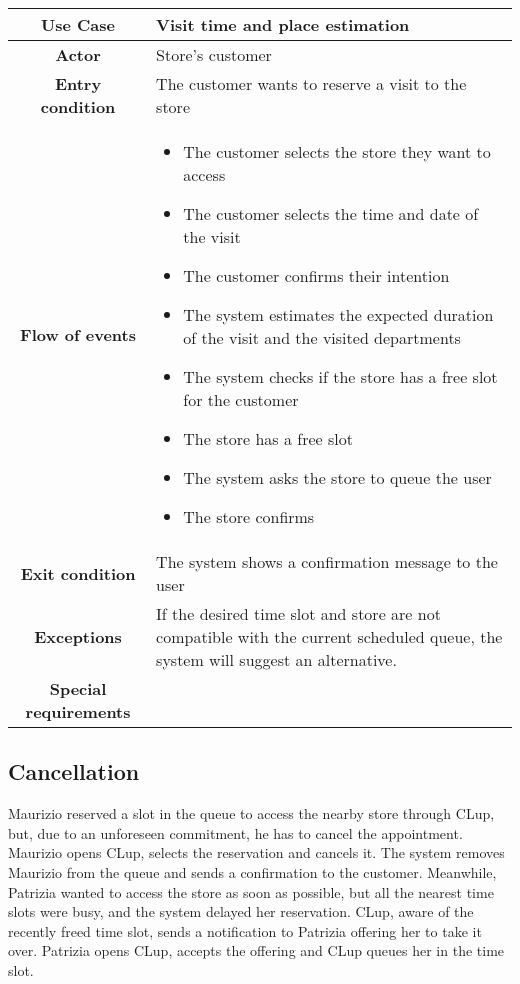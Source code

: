 \documentclass[../../main.tex]{subfiles}
\begin{document}
    \begin{table}[H]
      \centering
        \begin{tabular}{c m{}}
        \hline
        \textbf{Use Case} & Visit time and place estimation\\ \hline
        \textbf{Actor} & Store's customer\\ \hline
        \textbf{Entry condition} & The customer wants to reserve a visit to the store\\  \hline
        \textbf{Flow of events} & \begin{itemize}
                                    \item The customer selects the store they want to access
                                    \item The customer selects the time and date of the visit
                                    \item The customer confirms their intention
                                    \item The system estimates the expected duration of the visit and the visited departments
                                    \item The system checks if the store has a free slot for the customer
                                    \item The store has a free slot
                                    \item The system asks the store to queue the user
                                    \item The store confirms
                                  \end{itemize}\\ \hline
        \textbf{Exit condition} & The system shows a confirmation message to the user \\ \hline
        \textbf{Exceptions} & If the desired time slot and store are not compatible with the current scheduled queue, the system will suggest an alternative. \\ \hline
        \textbf{Special requirements} &\\ \hline
        \end{tabular}
    \end{table}

    \subsection{Cancellation}

    Maurizio reserved a slot in the queue to access the nearby store through CLup, but, due to an unforeseen commitment, 
    he has to cancel the appointment. Maurizio opens CLup, selects the reservation and cancels it. 
    The system removes Maurizio from the queue and sends a confirmation to the customer. 
    Meanwhile, Patrizia wanted to access the store as soon as possible, but all the nearest time slots were busy, 
    and the system delayed her reservation. CLup, aware of the recently freed time slot, sends a notification to Patrizia offering her to take it over. 
    Patrizia opens CLup, accepts the offering and CLup queues her in the time slot.
\end{document}
